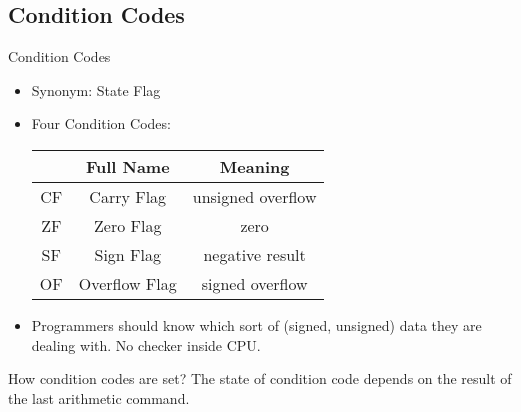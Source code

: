 \documentclass{beamer}
\newtheorem{rmk}{Remark}
\begin{document}
        \subsection{Condition Codes}
        \begin{frame}{Condition Codes}
            \begin{itemize}
                \item Synonym: State Flag
                \item<2-> Four Condition Codes:

                    \begin{tabular}{|c|c|c|}
                        \hline
                        &Full Name&Meaning\\
                        \hline\hline
                        CF&Carry Flag&unsigned overflow\\
                        \hline
                        ZF&Zero Flag&zero\\
                        \hline
                        SF&Sign Flag&negative result\\
                        \hline
                        OF&Overflow Flag&signed overflow\\
                        \hline
                    \end{tabular}

                \item<3-> Programmers should know which sort of (signed, unsigned) data they are dealing with. No checker inside CPU.
            \end{itemize}
        \end{frame}
        \begin{frame}{How condition codes are set?}
            The state of condition code depends on the result of the last arithmetic command.
        \end{frame}
\end{document}
